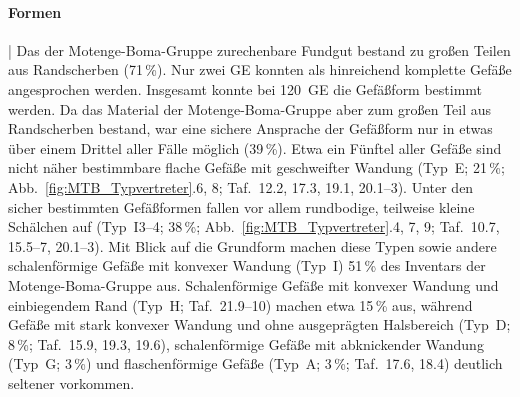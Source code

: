 \paragraph{Formen}\hspace{-.5em}|\hspace{.5em}%
Das der Motenge-Boma-Gruppe zurechenbare Fundgut bestand zu großen Teilen aus Randscherben (71\,\%). Nur zwei GE konnten als hinreichend komplette Gefäße angesprochen werden. Insgesamt konnte bei 120~GE die Gefäßform bestimmt werden. Da das Material der \mbox{Motenge}-Boma-Gruppe aber zum großen Teil aus Randscherben bestand, war eine sichere Ansprache der Gefäßform nur in etwas über einem Drittel aller Fälle möglich (39\,\%). Etwa ein Fünftel aller Gefäße sind nicht näher bestimmbare flache Gefäße mit geschweifter Wandung (Typ~E; 21\,\%; Abb.~\ref{fig:MTB_Typvertreter}.6, 8; Taf.~12.2, 17.3, 19.1, 20.1--3). Unter den sicher bestimmten Gefäßformen fallen vor allem rundbodige, teilweise kleine Schälchen auf (Typ~I3--4; 38\,\%; Abb.~\ref{fig:MTB_Typvertreter}.4, 7, 9; Taf.~10.7, 15.5--7, 20.1--3). Mit Blick auf die Grundform machen diese Typen sowie andere schalenförmige Gefäße mit konvexer Wandung (Typ~I) 51\,\% des Inventars der Motenge-Boma-Gruppe aus. Schalenförmige Gefäße mit konvexer Wandung und einbiegendem Rand (Typ~H; Taf.~21.9--10) machen etwa 15\,\% aus, während Gefäße mit stark konvexer Wandung und ohne ausgeprägten Halsbereich (Typ~D; 8\,\%; Taf.~15.9, 19.3, 19.6), schalenförmige Gefäße mit abknickender Wandung (Typ~G; 3\,\%) und flaschenförmige Gefäße (Typ~A; 3\,\%; Taf.~17.6, 18.4) deutlich seltener vorkommen.

